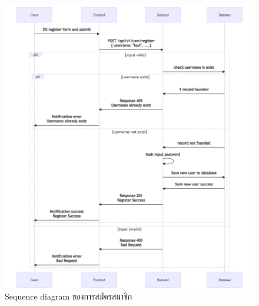 \documentclass[12pt,oneside,openright,a4paper]{cpe-thai-project}
\begin{document}
\begin{figure}[!ht]\centering
  \includegraphics[width=\textwidth]{./img/seq_regis.png}
  \caption{Sequence diagram ของการสมัครสมาชิก}\label{fig:seq_regis} 
\end{figure}
\newpage
\end{document}
